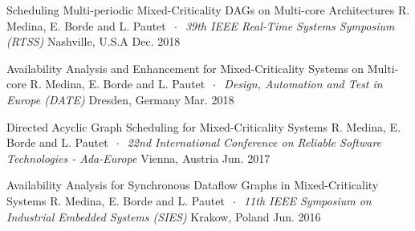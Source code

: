 


%

\begin{cvhonors}


\cvhonor
{Scheduling Multi-periodic Mixed-Criticality DAGs on Multi-core Architectures} 
{\newline
	R. Medina, E. Borde and L. Pautet $~\cdot~$ \textit{39th IEEE Real-Time 
	Systems Symposium (RTSS)} } %
{Nashville, U.S.A} %
{Dec. 2018} %


\cvhonor
{Availability Analysis and Enhancement for Mixed-Criticality Systems on 
Multi-core} %
{\newline
	R. Medina, E. Borde and L. Pautet $~\cdot~$ \textit{Design, Automation and 
	Test in Europe (DATE)}} %
{Dresden, Germany} %
{Mar. 2018} %


\cvhonor
{Directed Acyclic Graph Scheduling for Mixed-Criticality Systems} %
{\newline
	R. Medina, E. Borde and L. Pautet $~\cdot~$ \textit{22nd International 
	Conference on Reliable Software Technologies - Ada-Europe}} %
{Vienna, Austria} %
{Jun. 2017} %


\cvhonor
{Availability Analysis for Synchronous Dataflow Graphs in Mixed-Criticality 
Systems} %
{\newline
	R. Medina, E. Borde and L. Pautet $~\cdot~$ \textit{11th IEEE 
	Symposium on Industrial Embedded Systems (SIES)}} %
{Krakow, Poland} %
{Jun. 2016} %


\end{cvhonors}

